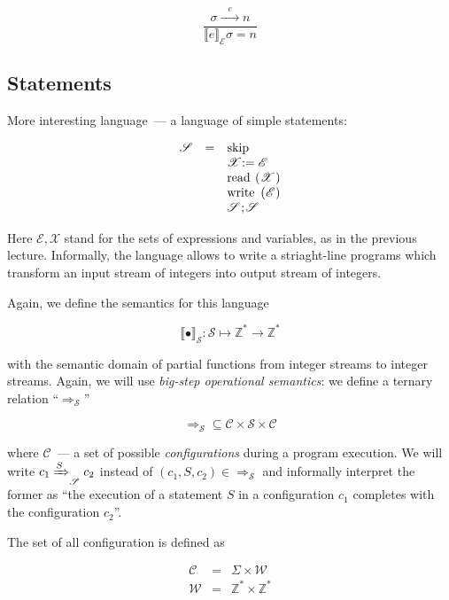 \documentclass{article}
\def\transarrow{\xrightarrow}
\def\padding{\phantom{X}}
\def\subarrow{}
\newcommand{\trule}[2]{\frac{#1}{#2}}
\newcommand{\trans}[3]{{#1}\transarrow{\padding{\textstyle #2}\padding}\subarrow{#3}}
\newcommand{\sembr}[1]{\llbracket{#1}\rrbracket}
\begin{document}
\[
\trule{\trans{\sigma}{e}{n}}{\sembr{e}_{\mathscr E}\sigma=n}
\]

\subsection{Statements}

More interesting language~--- a language of simple statements:

\[
\renewcommand{\arraystretch}{1}
\begin{array}{rcl}  
  \mathscr S & = & \mbox{\lstinline|skip|} \\
             &   & \mathscr X \mbox{\lstinline|:=|} \;\mathscr E \\
             &   & \mbox{\lstinline|read (|} \mathscr X \mbox{\lstinline|)|} \\
             &   & \mbox{\lstinline|write (|} \mathscr E \mbox{\lstinline|)|} \\
             &   & \mathscr S \mbox{\lstinline|;|} \mathscr S
\end{array}
\]

Here $\mathscr E, \mathscr X$ stand for the sets of expressions and variables, as in the previous lecture.
Informally, the language allows to write a striaght-line programs which transform an input stream of integers into
output stream of integers.

Again, we define the semantics for this language 

\[
\sembr{\bullet}_{\mathscr S} : \mathscr S \mapsto \mathbb Z^* \to \mathbb Z^*
\]

with the semantic domain of partial functions from integer streams to integer streams. Again, we will
use \emph{big-step operational semantics}: we define a ternary relation ``$\Rightarrow_{\mathscr S}$''

\[
\Rightarrow_{\mathscr S} \subseteq \mathscr C \times \mathscr S \times \mathscr C
\]

where $\mathscr C$~--- a set of possible \emph{configurations} during a program execution.
We will write $c_1\xRightarrow{S}_{\mathscr S}c_2$ instead of $(c_1, S, c_2)\in\Rightarrow_{\mathscr S}$ and informally
interpret the former as ``the execution of a statement $S$ in a configuration $c_1$ completes with the configuration
$c_2$''.

The set of all configuration is defined as

\[
\begin{array}{rcl}
  \mathscr C &=& \Sigma \times \mathscr W\\
  \mathscr W &=& \mathbb Z^* \times \mathbb Z^*
\end{array}
\]
\end{document}
